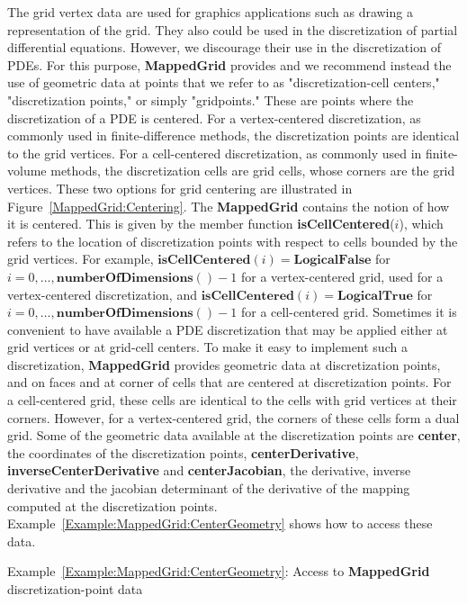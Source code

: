 \documentclass{article}
\begin{document}
The grid vertex data are used for graphics applications such as drawing a representation of the grid.  They also could be used in the
discretization of partial differential equations.  However, we discourage their use in the discretization of PDEs.  For this purpose,
\textbf{MappedGrid} provides and we recommend instead the use of geometric data at points that we refer to as "discretization-cell
centers," "discretization points," or simply "gridpoints."  These are points where the discretization of a PDE is centered.  For a
vertex-centered discretization, as commonly used in finite-difference methods, the discretization points are identical to the grid vertices.
For a cell-centered discretization, as commonly used in finite-volume methods, the discretization cells are grid cells, whose corners are the
grid vertices.  These two options for grid centering are illustrated in Figure~\ref{MappedGrid:Centering}.  The
\textbf{MappedGrid} contains the notion of how it is centered.  This is given by the member function \textbf{isCellCentered}($i$),
which refers to the location of discretization points with respect to cells bounded by the grid vertices.  For example,
$\textbf{isCellCentered}(i) = \textbf{LogicalFalse}$ for $i=0,\dots,\textbf{numberOfDimensions}()-1$ for a vertex-centered
grid, used for a vertex-centered discretization, and $\textbf{isCellCentered}(i) = \textbf{LogicalTrue}$ for
$i=0,\dots,\textbf{numberOfDimensions}()-1$ for a cell-centered grid.  Sometimes it is convenient to have available a PDE
discretization that may be applied either at grid vertices or at grid-cell centers.  To make it easy to implement such a discretization,
\textbf{MappedGrid} provides geometric data at discretization points, and on faces and at corner of cells that are centered at
discretization points.  For a cell-centered grid, these cells are identical to the cells with grid vertices at their corners.
However, for a vertex-centered grid, the corners of these cells form a dual grid.  Some of the geometric data available at the
discretization points are \textbf{center}, the coordinates of the discretization points, \textbf{centerDerivative},
\textbf{inverseCenterDerivative} and \textbf{centerJacobian}, the derivative, inverse derivative and the jacobian determinant
of the derivative of the mapping computed at the discretization points.
Example~\ref{Example:MappedGrid:CenterGeometry} shows how to access these data.

{\small
{}
}
{\center Example~\ref{Example:MappedGrid:CenterGeometry}: Access to \textbf{MappedGrid} discretization-point data\label{Example:MappedGrid:CenterGeometry}}
\end{document}
